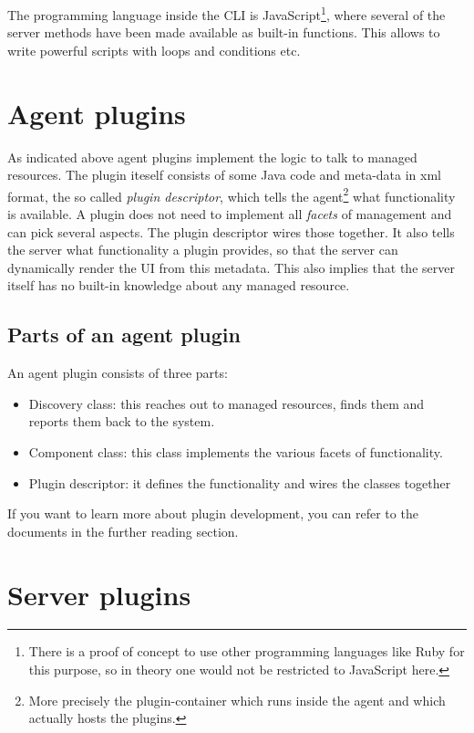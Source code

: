 \documentclass[twocolumn,10pt,a4paper]{article}
\begin{document}
The programming language inside the CLI is JavaScript\footnote{There is a proof of concept to use other programming languages like Ruby for this purpose, so in theory one would not be restricted to JavaScript here.}, where several of the server methods have been made available as built-in functions. This allows to write powerful scripts with loops and conditions etc.

\section{Agent plugins}

As indicated above agent plugins implement the logic to talk to managed resources. The plugin iteself consists of some Java code and meta-data in xml format, the so called \emph{plugin descriptor}, which tells the agent\footnote{More precisely the plugin-container which runs inside the agent and which actually hosts the plugins.} what functionality is available. A plugin does not need to implement all \emph{facets} of management and can pick several aspects. The plugin descriptor wires those together. It also tells the server what functionality a plugin provides, so that the server can dynamically render the UI from this metadata. This also implies that the server itself has no built-in knowledge about any managed resource.

\subsection{Parts of an agent plugin}

An agent plugin consists of three parts:
\begin{itemize}
\item Discovery class: this reaches out to managed resources, finds them and reports them back to the system.
\item Component class: this class implements the various facets of functionality.
\item Plugin descriptor: it defines the functionality and wires the classes together
\end{itemize}

If you want to learn more about plugin development, you can refer to the documents in the further reading section.

\section{Server plugins}
\end{document}
